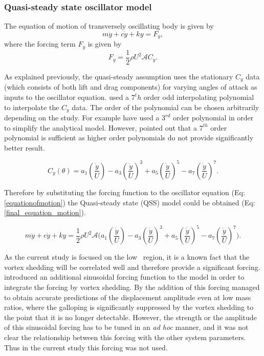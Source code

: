 

\subsubsection*{Quasi-steady state oscillator model}

The equation of motion of transversely oscillating body is given by 
\begin{equation}
\label{equationofmotion}
m\ddot{y}+c\dot{y}+ky=F_y,
\end{equation}
where the forcing term $F_y$ is given by
\begin{equation}
\label{lift equation}
F_y=\frac{1}{2}\rho U^2\mathcal{A}C_y.
\end{equation}

As explained previously, the quasi-steady assumption uses the stationary $C_y$ data (which consists of both lift and drag components) for varying angles of attack as inputs to the oscillator equation.\citet{Parkinson1964} used a $7^th$ order odd interpolating polynomial to interpolate the $C_y$ data. The order of the polynomial can be chosen arbitrarily depending on the study. For example \citet{Barrero-Gil2009,Barrero-Gil2010a} have used a $3^{rd}$ order polynomial in order to simplify the analytical model. However, \citet{Ng2005} pointed out that a $7^{th}$ order polynomial is sufficient as higher order polynomials do not provide significantly better result.    

\begin{equation}
\label{cy ploynomial}
C_y(\theta)=a_1\left(\frac{\dot{y}}{U}\right)-a_3\left(\frac{\dot{y}}{U}\right)^3+a_5\left(\frac{\dot{y}}{U}\right)^5-a_7\left(\frac{\dot{y}}{U}\right)^7.
\end{equation}

Therefore by substituting the forcing function to the oscillator equation (Eq:\ref{equationofmotion}) the Quasi-steady state (QSS) model could be obtained (Eq:\ref{final_equation_motion}). 

\begin{equation}
\label{final_equation_motion}
m\ddot{y}{+}c\dot{y}{+}ky{=}\frac{1}{2}\rho U^2 \mathcal {A} \Bigg(a_1\left(\frac{\dot{y}}{U}\right){-}a_3\left(\frac{\dot{y}}{U}\right)^3{+}a_5\left(\frac{\dot{y}}{U}\right)^5{-}a_7\left(\frac{\dot{y}}{U}\right)^7 \Bigg).
\end{equation}

As the current study is focused on the low \reynoldsnumber\ region, it is a known fact that the vortex shedding will be correlated well and therefore provide a significant forcing. \citet{Joly2012} introduced an additional sinusoidal forcing function to the model in order to integrate the forcing by vortex shedding. By the addition of this forcing \citet{Joly2012} managed to obtain accurate predictions of the displacement amplitude even at low mass ratios, where the galloping is significantly suppressed by the vortex shedding to the point that it is no longer detectable. However, the strength or the amplitude of this sinusoidal forcing has to be tuned in an \emph{ad hoc} manner, and it was not clear the relationship between this forcing with the other system parameters. Thus in the current study this forcing was not used.

